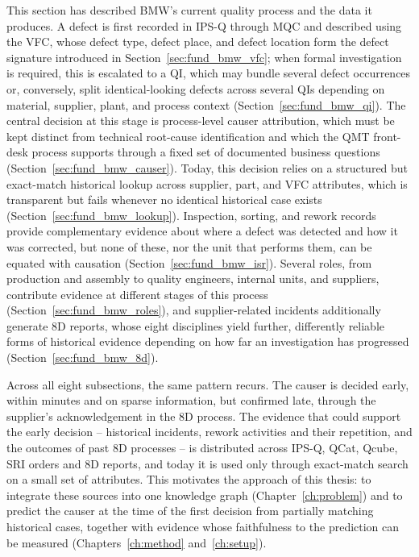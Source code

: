 This section has described BMW's current quality process and the data it
produces. A defect is first recorded in IPS-Q through MQC and described
using the VFC, whose defect type, defect place, and defect location form
the defect signature introduced in Section~\ref{sec:fund_bmw_vfc}; when
formal investigation is required, this is escalated to a QI, which may
bundle several defect occurrences or, conversely, split identical-looking
defects across several QIs depending on material, supplier, plant, and
process context (Section~\ref{sec:fund_bmw_qi}). The central decision at
this stage is process-level causer attribution, which must be kept
distinct from technical root-cause identification and which the QMT
front-desk process supports through a fixed set of documented business
questions (Section~\ref{sec:fund_bmw_causer}). Today, this decision relies
on a structured but exact-match historical lookup across supplier, part,
and VFC attributes, which is transparent but fails whenever no identical
historical case exists (Section~\ref{sec:fund_bmw_lookup}). Inspection,
sorting, and rework records provide complementary evidence about where a
defect was detected and how it was corrected, but none of these, nor the
unit that performs them, can be equated with causation
(Section~\ref{sec:fund_bmw_isr}). Several roles, from production and
assembly to quality engineers, internal units, and suppliers, contribute
evidence at different stages of this process
(Section~\ref{sec:fund_bmw_roles}), and supplier-related incidents
additionally generate 8D reports, whose eight disciplines yield
further, differently reliable forms of historical evidence depending on
how far an investigation has progressed (Section~\ref{sec:fund_bmw_8d}).

Across all eight subsections, the same pattern recurs. The causer is
decided early, within minutes and on sparse information, but confirmed
late, through the supplier's acknowledgement in the 8D process. The
evidence that could support the early decision -- historical incidents,
rework activities and their repetition, and the outcomes of past 8D
processes -- is distributed across IPS-Q, QCat, Qcube, SRI orders and 8D
reports, and today it is used only through exact-match search on a small
set of attributes. This motivates the approach of this thesis: to
integrate these sources into one knowledge graph (Chapter~\ref{ch:problem})
and to predict the causer at the time of the first decision from partially
matching historical cases, together with evidence whose faithfulness to
the prediction can be measured (Chapters~\ref{ch:method}
and~\ref{ch:setup}).
